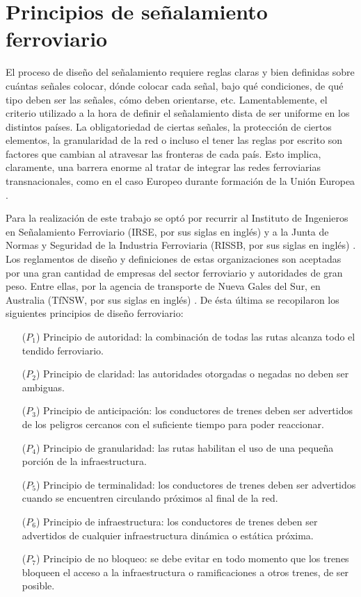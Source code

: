 \section{Principios de señalamiento ferroviario}
    \label{sec:principios}
    
    El proceso de diseño del señalamiento requiere reglas claras y bien definidas sobre cuántas señales colocar, dónde colocar cada señal, bajo qué condiciones, de qué tipo deben ser las señales, cómo deben orientarse, etc. Lamentablemente, el criterio utilizado a la hora de definir el señalamiento dista de ser uniforme en los distintos países. La obligatoriedad de ciertas señales, la protección de ciertos elementos, la granularidad de la red o incluso el tener las reglas por escrito son factores que cambian al atravesar las fronteras de cada país. Esto implica, claramente, una barrera enorme al tratar de integrar las redes ferroviarias transnacionales, como en el caso Europeo durante formación de la Unión Europea \cite{Paper_4,Paper_185}.
    
    Para la realización de este trabajo se optó por recurrir al Instituto de Ingenieros en Señalamiento Ferroviario (IRSE, por sus siglas en inglés) \cite{IRSE} y a la Junta de Normas y Seguridad de la Industria Ferroviaria (RISSB, por sus siglas en inglés) \cite{Paper_175,Paper_176,Paper_203}. Los reglamentos de diseño y definiciones de estas organizaciones son aceptadas por una gran cantidad de empresas del sector ferroviario y autoridades de gran peso. Entre ellas, por la agencia de transporte de Nueva Gales del Sur, en Australia (TfNSW, por sus siglas en inglés) \cite{Paper_202}. De ésta última se recopilaron los siguientes principios de diseño ferroviario:
    
    \begin{itemize}
        \item [($P_1$)] Principio de autoridad: la combinación de todas las rutas alcanza todo el tendido ferroviario.
        \item [($P_2$)] Principio de claridad: las autoridades otorgadas o negadas no deben ser ambiguas. 
        \item [($P_3$)] Principio de anticipación: los conductores de trenes deben ser advertidos de los peligros cercanos con el suficiente tiempo para poder reaccionar.
        \item [($P_4$)] Principio de granularidad: las rutas habilitan el uso de una pequeña porción de la infraestructura.
        \item [($P_5$)] Principio de terminalidad: los conductores de trenes deben ser advertidos cuando se encuentren circulando próximos al final de la red.
        \item [($P_6$)] Principio de infraestructura: los conductores de trenes deben ser advertidos de cualquier infraestructura dinámica o estática próxima.
        \item [($P_7$)] Principio de no bloqueo: se debe evitar en todo momento que los trenes bloqueen el acceso a la infraestructura o ramificaciones a otros trenes, de ser posible.
    \end{itemize}

